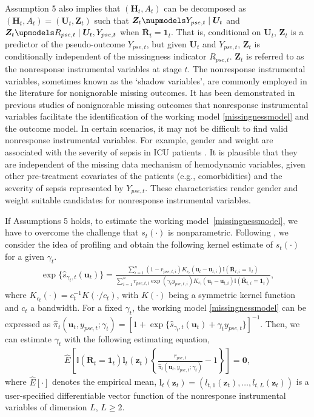 \documentclass[12pt]{article}
\begin{document}
Assumption 5 also implies that $(\bm{H}_t,A_t)$ can be decomposed as $(\bm{H}_t,A_t) = (\bm{U}_t,\bm{Z}_t)$ such that $\bm{Z}_t \nupmodels Y_{pse,t} \mid \bm{U}_t$ and $\bm{Z}_t \upmodels R_{pse,t} \mid  \bm{U}_t, Y_{pse,t}$ when $\overline{\bm{R}}_t=\bm{1}_t$. That is, conditional on $\bm{U}_t$, $\bm{Z}_t$ is a predictor of the pseudo-outcome $Y_{pse,t}$, but given $\bm{U}_t$ and $Y_{pse,t}$, $\bm{Z}_t$ is conditionally independent of the missingness indicator $R_{pse,t}$.
$\bm{Z}_t$ is referred to as the nonresponse instrumental variables at stage $t$. The nonresponse instrumental variables, sometimes known as the `shadow variables', are commonly employed in the literature for nonignorable missing outcomes.  It has been demonstrated in previous studies of nonignorable missing outcomes \citep{Shao_Wang_2016, Miao_Tchetgen_2016} that  nonresponse instrumental variables facilitate the identification of the working model \eqref{missingnessmodel} and the outcome model. In certain scenarios, it may not be difficult to find valid nonresponse instrumental variables. For example, gender and weight are associated with the severity of sepsis in ICU patients \citep{kalani2020sepsis, sakr2013influence}. It is plausible that they are independent of the missing data mechanism of hemodynamic variables, given other pre-treatment covariates of the patients  (e.g., comorbidities) and the severity of sepsis represented by $Y_{pse,t}$. These characteristics render gender and weight suitable candidates for nonresponse instrumental variables.


If Assumptions 5 holds, to estimate the working  model~\eqref{missingnessmodel}, we have to overcome the challenge that $s_t(\cdot)$ is nonparametric. Following \cite{Shao_Wang_2016}, we consider the idea of profiling and obtain the following kernel estimate of $s_t(\cdot)$ for a given $\gamma_t$.
\begin{align}
    \exp\{\widehat{s}_{\gamma_t,t}(\bm{u}_t) \} =  \frac{\sum_{i=1}^{n} \left(1-r_{pse,t,i}\right)  K_{c_t}\left(\bm{u}_t-\bm{u}_{t,i}\right) \mathbb{I}(\overline{\bm{R}}_{t,i}=\bm{1}_t) }{\sum_{i=1}^{n}  r_{pse,t,i}   \exp \left(\gamma_t y_{pse,t,i}\right) K_{c_t}\left(\bm{u}_t-\bm{u}_{t,i}\right) \mathbb{I} (\overline{\bm{R}}_{t,i}=\bm{1}_t)}, \label{2.1}
\end{align}
where $K_{c_t}(\cdot) = c_t^{-1}K(\cdot/c_t)$, with $K(\cdot)$ being a symmetric kernel function and $c_t$ a bandwidth. 
For a fixed $\gamma_t$, the working model \eqref{missingnessmodel} can be expressed as $\widehat{\pi}_t(\bm{u}_t,y_{pse,t};\gamma_t) = [1+\exp\{\widehat{s}_{\gamma_t,t}(\bm{u}_t) + \gamma_t y_{pse,t}\} ]^{-1}$.  Then, we can estimate $\gamma_t$ with the following estimating equation,
\begin{align}
    \widehat{E} \left[ \mathbb{I} (\overline{\bm{R}}_t=\bm{1}_t) \bm{l}_t(\bm{z}_t)\left\{\frac{r_{pse,t}}{\widehat{\pi}_t(\bm{u}_t,y_{pse,t}; \gamma_t)} -1 \right\} \right]  = \bm{0}, \label{2.2} 
\end{align}
where $\widehat{E}[\cdot]$ denotes the empirical mean, $\bm{l}_t(\bm{z}_t) = (l_{t,1}(\bm{z}_t), \ldots, l_{t, L}(\bm{z}_t))$ is a user-specified differentiable vector function of the nonresponse instrumental variables of dimension $L$, $L\geq2$. 
\end{document}
